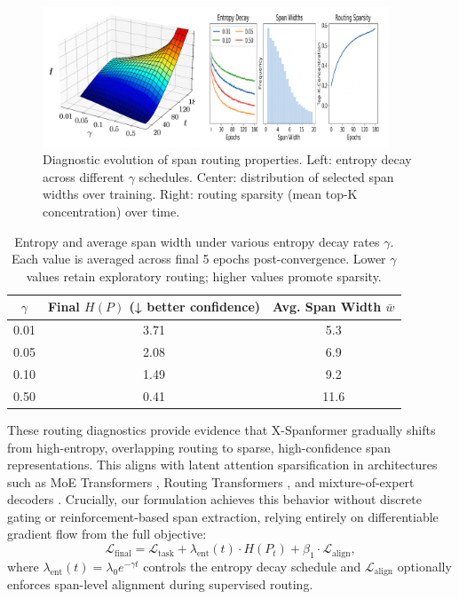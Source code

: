 \begin{figure}[H]
  \centering
  \includegraphics[width=0.92\textwidth]{figures/figure_6.png}
  \caption{Diagnostic evolution of span routing properties. Left: entropy decay across different \(\gamma\) schedules. Center: distribution of selected span widths over training. Right: routing sparsity (mean top-K concentration) over time.}
  \label{fig:span_stats}
\end{figure}

\begin{table}[H]
\centering
\caption{Entropy and average span width under various entropy decay rates \(\gamma\). Each value is averaged across final 5 epochs post-convergence. Lower \(\gamma\) values retain exploratory routing; higher values promote sparsity.}
\label{tab:entropy_sweep}
\begin{tabular}{c|c|c}
\toprule
\(\gamma\) & Final \(H(P)\) (↓ better confidence) & Avg. Span Width \(\bar{w}\) \\
\midrule
0.01 & 3.71 & 5.3 \\
0.05 & 2.08 & 6.9 \\
0.10 & 1.49 & 9.2 \\
0.50 & 0.41 & 11.6 \\
\bottomrule
\end{tabular}
\end{table}

\vspace{0.5em}
\noindent These routing diagnostics provide evidence that X-Spanformer gradually shifts from high-entropy, overlapping routing to sparse, high-confidence span representations. This aligns with latent attention sparsification in architectures such as MoE Transformers \cite{shazeer2017outrageously}, Routing Transformers \cite{tay2020sparse}, and mixture-of-expert decoders \cite{gupta2022molt}. Crucially, our formulation achieves this behavior without discrete gating or reinforcement-based span extraction, relying entirely on differentiable gradient flow from the full objective:
\[
\mathcal{L}_{\text{final}} = \mathcal{L}_{\text{task}} + \lambda_{\mathrm{ent}}(t) \cdot H(P_t) + \beta_1 \cdot \mathcal{L}_{\text{align}},
\]
where \(\lambda_{\mathrm{ent}}(t) = \lambda_0 e^{-\gamma t}\) controls the entropy decay schedule and \(\mathcal{L}_{\text{align}}\) optionally enforces span-level alignment during supervised routing.


